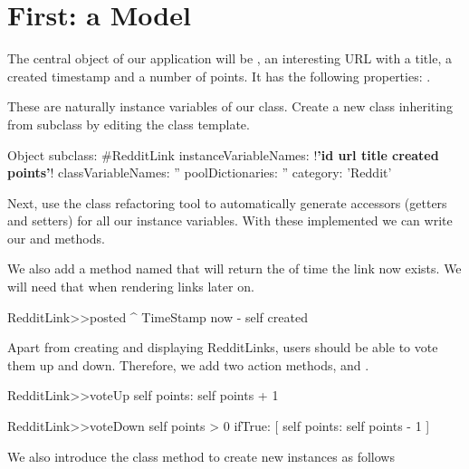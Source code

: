 \documentclass[a4paper,10pt,twoside]{book}
\begin{document}
\section{First: a Model}

The central object of our application will be , an interesting URL with a title, a created timestamp and a number of points. It has the following properties: .

These are naturally instance variables of our class. Create a new class inheriting from  subclass by editing the class template.

\begin{code}{}
Object subclass: #RedditLink 
   instanceVariableNames: !\textbf{'id url title created points'}! 
   classVariableNames: '' 
   poolDictionaries: '' 
   category: 'Reddit'
\end{code}

Next,  use the class refactoring tool to automatically generate accessors (getters and setters) for all our instance variables. With these implemented we can write our  and  methods.


We also add a method named   that will return the  of time the link now exists. 
We will need that when rendering links later on. 
\begin{code}{}
RedditLink>>posted
    ^ TimeStamp now - self created
\end{code}

Apart from creating and displaying RedditLinks, users should be able to vote them up and down. Therefore, we add two action methods,  and .

\begin{code}{}
RedditLink>>voteUp
    self points: self points + 1

RedditLink>>voteDown
    self points > 0 ifTrue: [ self points: self points - 1 ]
\end{code}


We also introduce the class method  to create new instances as follows
\end{document}
